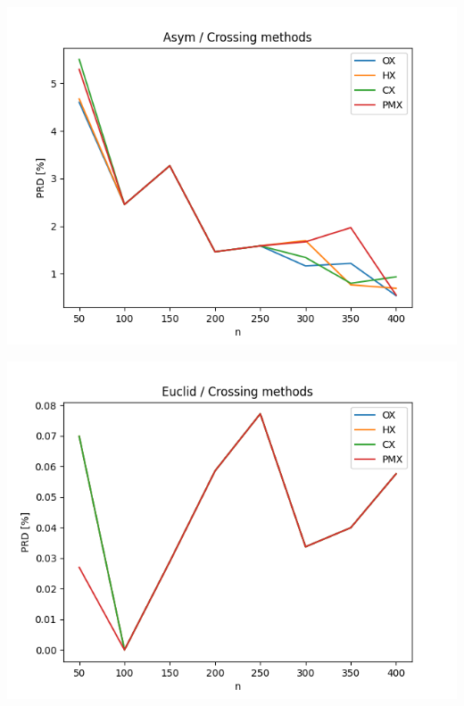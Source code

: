 \documentclass{article}
\begin{document}
\begin{center}
\includegraphics[width=\textwidth, 
                   height = 0.4\textheight, 
                   keepaspectratio]
                  {plots/asym_5_crossing} 
\end{center}

\begin{center}
\includegraphics[width=\textwidth, 
                   height = 0.4\textheight, 
                   keepaspectratio]
                  {plots/euclid_5_crossing} 
\end{center}
\end{document}

